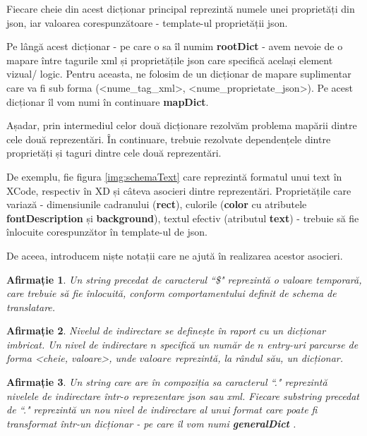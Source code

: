 Fiecare cheie din acest dicționar principal reprezintă numele unei proprietăți din json, iar valoarea corespunzătoare - template-ul proprietății json. 

Pe lângă acest dicționar - pe care o sa îl numim \textbf{rootDict} - avem nevoie de o mapare între tagurile xml și proprietățile json care specifică același element vizual/ logic. Pentru aceasta, ne folosim de un dicționar de mapare suplimentar care va fi sub forma (<nume_tag_xml>,  <nume_proprietate_json>). Pe acest dicționar îl vom numi în continuare \textbf{mapDict}.

Așadar, prin intermediul celor două dicționare rezolvăm problema mapării dintre cele două reprezentări. 
În continuare, trebuie rezolvate dependențele dintre proprietăți și taguri dintre cele două reprezentări.




De exemplu, fie figura \ref{img:schemaText} care reprezintă formatul unui text în XCode, respectiv în XD și câteva asocieri dintre reprezentări.
Proprietățile care variază - dimensiunile cadranului (\textbf{rect}), culorile (\textbf{color} cu atributele \textbf{fontDescription} și \textbf{background}), textul efectiv (atributul \textbf{text}) - trebuie să fie înlocuite corespunzător în template-ul de json.


De aceea, introducem niște notații care ne ajută în realizarea acestor asocieri. 
\\

\newtheorem{mydef}{Afirmație}[chapter]
\newtheorem{myNote}{Notă}[chapter]

\begin{mydef}\label{dollar}
Un string precedat de caracterul ``\$" reprezintă o valoare temporară, care trebuie să fie înlocuită, conform comportamentului definit de schema de translatare.\\
\end{mydef}


\begin{mydef}\label{nivel}
Nivelul de indirectare se definește în raport cu un dicționar imbricat. Un nivel de indirectare $n$ specifică un număr de $n$ entry-uri parcurse de forma <cheie, valoare>, unde $valoare$ reprezintă, la rândul său, un dicționar.\\
\end{mydef}


\begin{mydef}\label{dot}
Un string care are în compoziția sa caracterul ``." reprezintă nivelele de indirectare într-o reprezentare json sau xml. Fiecare substring precedat de ``." reprezintă un nou nivel de indirectare al unui format care poate fi transformat într-un dicționar - pe care îl vom numi \textbf{generalDict} .\\
\end{mydef}


